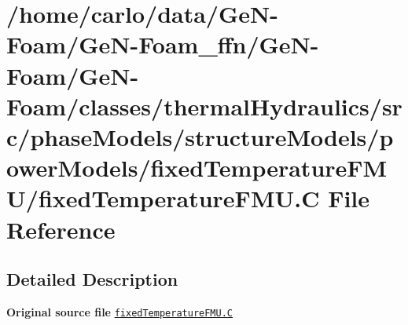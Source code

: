 \hypertarget{fixedTemperatureFMU_8C}{}\section{/home/carlo/data/\+Ge\+N-\/\+Foam/\+Ge\+N-\/\+Foam\+\_\+ffn/\+Ge\+N-\/\+Foam/\+Ge\+N-\/\+Foam/classes/thermal\+Hydraulics/src/phase\+Models/structure\+Models/power\+Models/fixed\+Temperature\+F\+M\+U/fixed\+Temperature\+F\+MU.C File Reference}
\label{fixedTemperatureFMU_8C}


\subsection{Detailed Description}
{\bfseries Original source file} \href{../../../home/carlo/data/GeN-Foam/GeN-Foam_ffn/GeN-Foam/GeN-Foam/classes/thermalHydraulics/src/phaseModels/structureModels/powerModels/fixedTemperatureFMU/fixedTemperatureFMU.C}{\tt fixed\+Temperature\+F\+M\+U.\+C} 